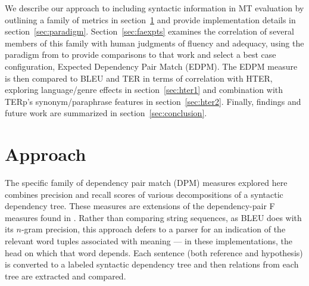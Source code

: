 \documentclass{kluwer}    %
\begin{document}
\begin{article}
We describe our approach to including syntactic information in MT
evaluation by outlining a family of metrics in
section~\ref{sec:approach} and provide implementation details in
section~\ref{sec:paradigm}.  Section~\ref{sec:faexpts} examines the
correlation of several members of this family with human judgments of
fluency and adequacy, using the paradigm from
\cite{owczarzak07evaluatingmt} to provide comparisons to that work and
select a best case configuration, Expected Dependency Pair Match
(EDPM). The EDPM measure is then compared to BLEU and TER in terms of
correlation with HTER, exploring language/genre effects in
section~\ref{sec:hter1} and combination with TERp's synonym/paraphrase
features in section~\ref{sec:hter2}. Finally, findings and future work
are summarized in section~\ref{sec:conclusion}.

\section{Approach}
\label{sec:approach}


The specific family of dependency pair match (DPM) measures explored here
combines precision and recall scores of various
decompositions of a syntactic dependency tree. These measures are
extensions of the dependency-pair F measures found in
.  Rather than comparing
string sequences, as BLEU does with its $n$-gram precision, this
approach defers to a parser for an indication of the relevant word
tuples associated with meaning --- in these implementations, the head
on which that word depends.  Each sentence (both reference and
hypothesis) is converted to a labeled syntactic dependency tree and
then relations from each tree are extracted and compared.


\end{article}
\end{document}
